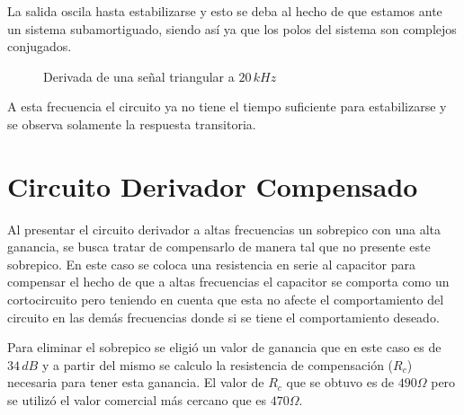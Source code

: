 \documentclass[11pt, a4paper]{article}
\begin{document}
La salida oscila hasta estabilizarse y esto se deba al hecho de que estamos ante un sistema subamortiguado, siendo así ya que los polos del sistema son complejos conjugados.

\begin{figure}[H]
	\begin{center}
		\caption{Derivada de una señal triangular a $20 \, kHz$}
		\label{fig:derivtriangNOcomp20kHz}
	\end{center}
\end{figure}

A esta frecuencia el circuito ya no tiene el tiempo suficiente para estabilizarse y se observa solamente la respuesta transitoria.



\section{Circuito Derivador Compensado}
Al presentar el circuito derivador a altas frecuencias un sobrepico con una alta ganancia, se busca tratar de compensarlo de manera tal que no presente este sobrepico.
En este caso se coloca una resistencia en serie al capacitor para compensar el hecho de que a altas frecuencias el capacitor se comporta como un cortocircuito pero teniendo en cuenta que esta no afecte el comportamiento del circuito en las demás frecuencias donde si se tiene el comportamiento deseado.

Para eliminar el sobrepico se eligió un valor de ganancia que en este caso es de $34 \, dB$ y a partir del mismo se calculo la resistencia de compensación ($R_c$) necesaria para tener esta ganancia. El valor de $R_c$ que se obtuvo es de $490 \Omega$ pero se utilizó el valor comercial más cercano que es $470 \Omega$.
\end{document}
